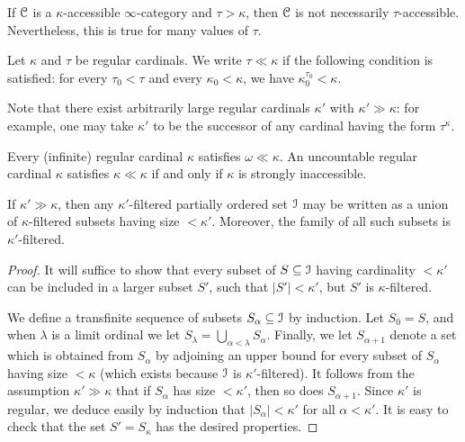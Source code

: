 If $\operatorname{\mathcal{C}}$ is a $\kappa$-accessible $\infty$-category and $\tau > \kappa$, then $\operatorname{\mathcal{C}}$
is not necessarily $\tau$-accessible. Nevertheless, this is true for many values of $\tau$.

\begin{definition}\label{ineq}
Let $\kappa$ and $\tau$ be regular cardinals. We write $\tau \ll \kappa$ if the following condition is satisfied: for every $\tau_0 < \tau$ and every $\kappa_0 < \kappa$, we have $\kappa_0^{\tau_0} < \kappa$.
\end{definition}

Note that there exist arbitrarily large regular
cardinals $\kappa'$ with $\kappa' \gg \kappa$: for example, one
may take $\kappa'$ to be the successor of any cardinal having the
form $\tau^{\kappa}$.

\begin{remark}
Every (infinite) regular cardinal $\kappa$ satisfies $\omega \ll \kappa$.
An uncountable regular cardinal $\kappa$ satisfies $\kappa \ll \kappa$ if and only if $\kappa$ is strongly inaccessible.
\end{remark}

\begin{lemma}\label{estimate}
If $\kappa' \gg \kappa$, then any $\kappa'$-filtered partially
ordered set $\operatorname{\mathcal{I}}$ may be written as a union of $\kappa$-filtered
subsets having size $< \kappa'$. Moreover, the family of all such
subsets is $\kappa'$-filtered.
\end{lemma}

\begin{proof}
It will suffice to show that every subset of $S \subseteq \operatorname{\mathcal{I}}$
having cardinality $< \kappa'$ can be included in a larger subset
$S'$, such that $|S'| < \kappa'$, but $S'$ is $\kappa$-filtered.

We define a transfinite sequence of subsets $S_{\alpha} \subseteq
\operatorname{\mathcal{I}}$ by induction. Let $S_{0} = S$, and when $\lambda$ is a
limit ordinal we let $S_{\lambda} = \bigcup_{\alpha < \lambda}
S_{\alpha}$. Finally, we let $S_{\alpha + 1}$ denote a set which
is obtained from $S_{\alpha}$ by adjoining an upper bound for
every subset of $S_{\alpha}$ having size $< \kappa$ (which exists
because $\operatorname{\mathcal{I}}$ is $\kappa'$-filtered). It follows from the
assumption $\kappa' \gg \kappa$ that if $S_{\alpha}$ has size $<
\kappa'$, then so does $S_{\alpha + 1}$. Since $\kappa'$ is
regular, we deduce easily by induction that $|S_{\alpha}| <
\kappa'$ for all $\alpha < \kappa'$. It is easy to check that the
set $S' = S_{\kappa}$ has the desired properties.
\end{proof}

